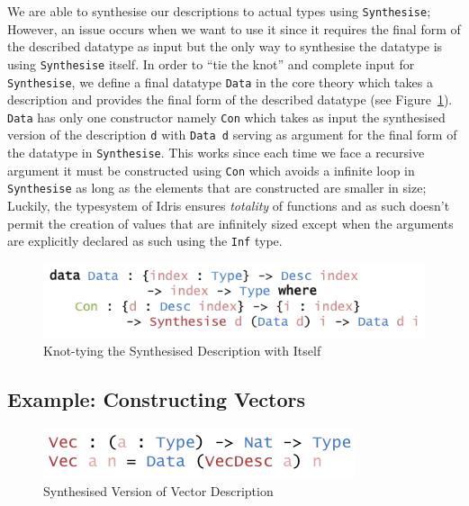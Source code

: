 \documentclass{ituthesis}
\begin{document}
We are able to synthesise our descriptions to actual types using \texttt{Synthesise}; However, an issue occurs when we want to use it since it requires the final form of the described datatype as input but the only way to synthesise the datatype is using \texttt{Synthesise} itself.
In order to ``tie the knot'' and complete input for \texttt{Synthesise}, we define a final datatype \texttt{Data} in the core theory which takes a description and provides the final form of the described datatype (see Figure~\ref{fig:datafromdesc}).
\texttt{Data} has only one constructor namely \texttt{Con} which takes as input the synthesised version of the description \texttt{d} with \texttt{Data d} serving as argument for the final form of the datatype in \texttt{Synthesise}. This works since each time we face a recursive argument it must be constructed using \texttt{Con} which avoids a infinite loop in \texttt{Synthesise} as long as the elements that are constructed are smaller in size; Luckily, the typesystem of Idris ensures \textit{totality} of functions and as such doesn't permit the creation of values that are infinitely sized except when the arguments are explicitly declared as such using the \texttt{Inf} type.

\begin{figure}[ht]
\begin{center}
    \includegraphics[scale=0.5]{Figures/TyingTheSynthesisKnot.png}
\end{center}
\caption{Knot-tying the Synthesised Description with Itself}
\label{fig:datafromdesc}
\end{figure}

\subsection{Example: Constructing Vectors}
\label{sub:Example:Constructing Vectors}

\begin{figure}[ht]
\begin{center}
    \includegraphics[scale=0.5]{Figures/VectorSynthesisedDesc.png}
\end{center}
\caption{Synthesised Version of Vector Description}
\label{fig:synthversvecdesc}
\end{figure}
\end{document}
